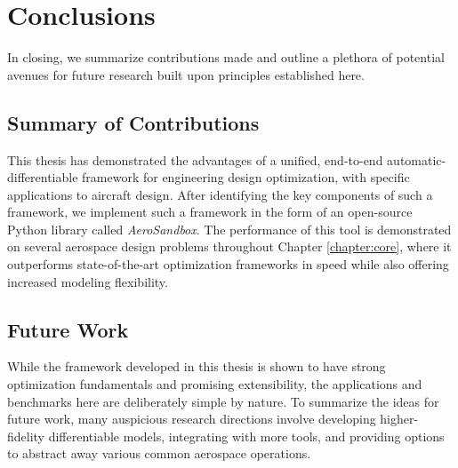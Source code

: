 \chapter{Conclusions}

In closing, we summarize contributions made and outline a plethora of potential avenues for future research built upon principles established here.


\section{Summary of Contributions}

This thesis has demonstrated the advantages of a unified, end-to-end automatic-differentiable framework for engineering design optimization, with specific applications to aircraft design. After identifying the key components of such a framework, we implement such a framework in the form of an open-source Python library called \textit{AeroSandbox}. The performance of this tool is demonstrated on several aerospace design problems throughout Chapter \ref{chapter:core}, where it outperforms state-of-the-art optimization frameworks in speed while also offering increased modeling flexibility.

%
%
%


\section{Future Work}

While the framework developed in this thesis is shown to have strong optimization fundamentals and promising extensibility, the applications and benchmarks here are deliberately simple by nature. To summarize the ideas for future work, many auspicious research directions involve developing higher-fidelity differentiable models, integrating with more tools, and providing options to abstract away various common aerospace operations.

